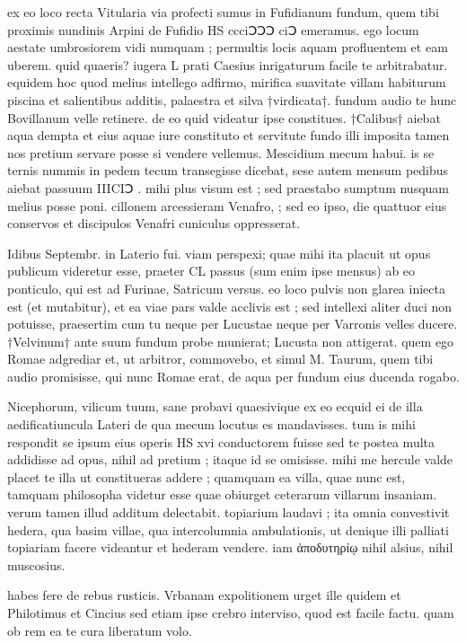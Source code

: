  ex eo loco recta Vitularia via profecti sumus in Fufidianum fundum, quem tibi proximis nundinis Arpini de Fufidio HS ccciↃↃↃ ciↃ emeramus. ego locum aestate umbrosiorem vidi numquam ; permultis locis aquam profluentem et eam uberem. quid quaeris? iugera L prati Caesius inrigaturum facile te arbitrabatur. equidem hoc quod melius intellego adfirmo, mirifica suavitate villam habiturum piscina et salientibus additis, palaestra et silva †virdicata†. fundum audio te hunc Bovillanum velle retinere. de eo quid videatur ipse constitues. †Calibus† aiebat aqua dempta et eius aquae iure constituto et servitute fundo illi imposita tamen nos pretium servare posse si vendere vellemus. Mescidium mecum habui. is se ternis nummis in pedem tecum transegisse dicebat, sese autem mensum pedibus aiebat passuum IIICIↃ . mihi plus visum est ; sed praestabo sumptum nusquam melius posse poni. cillonem arcessieram Venafro, ; sed eo ipso, die quattuor eius conservos et discipulos Venafri cuniculus oppresserat.

 Idibus Septembr. in Laterio fui. viam perspexi; quae mihi ita placuit ut opus publicum videretur esse, praeter CL passus (sum enim ipse mensus) ab eo ponticulo, qui est ad Furinae, Satricum versus. eo loco pulvis non glarea iniecta est (et mutabitur), et ea viae pars valde acclivis est ; sed intellexi aliter duci non potuisse, praesertim cum tu neque per Lucustae neque per Varronis velles ducere. †Velvinum† ante suum fundum probe munierat; Lucusta non attigerat. quem ego Romae adgrediar et, ut arbitror, commovebo, et simul M. Taurum, quem tibi audio promisisse, qui nunc Romae erat, de aqua per fundum eius ducenda rogabo.

 Nicephorum, vilicum tuum, sane probavi quaesivique ex eo ecquid ei de illa aedificatiuncula Lateri de qua mecum locutus es mandavisses. tum is mihi respondit se ipsum eius operis HS xvi conductorem fuisse sed te postea multa addidisse ad opus, nihil ad pretium ; itaque id se omisisse. mihi me hercule valde placet te illa ut constitueras addere ; quamquam ea villa, quae nunc est, tamquam philosopha videtur esse quae obiurget ceterarum villarum insaniam. verum tamen illud additum delectabit. topiarium laudavi ; ita omnia convestivit hedera, qua basim villae, qua intercolumnia ambulationis, ut denique illi palliati topiariam facere videantur et hederam vendere. iam ἀποδυτηρίῳ nihil alsius, nihil muscosius.

 habes fere de rebus rusticis. Vrbanam expolitionem urget ille quidem et Philotimus et Cincius sed etiam ipse crebro interviso, quod est facile factu. quam ob rem ea te cura liberatum volo.

